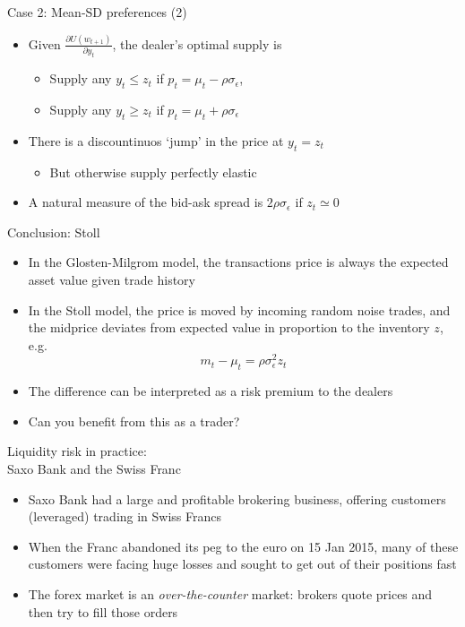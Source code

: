 \documentclass[english,10pt]{beamer}
\begin{document}
\begin{frame}{Case 2: Mean-SD preferences (2)}
	\begin{itemize}
		\item Given $\frac{\partial U(w_{t+1})}{\partial y_t}$, the dealer's optimal supply is
		\begin{itemize}
			\item Supply any $y_t \leq z_t$ if $p_t = \mu_t - \rho\sigma_{\epsilon}$,
			\item Supply any $y_t \geq z_t$ if $p_t = \mu_t + \rho\sigma_{\epsilon}$
		\end{itemize}
		\item There is a discountinuos `jump' in the price at $y_t=z_t$
		\begin{itemize}
			\item But otherwise supply perfectly elastic
		\end{itemize}
		\item A natural measure of the bid-ask spread is $2\rho\sigma_{\epsilon}$ if $z_t \simeq 0$
	\end{itemize}
\end{frame}


\begin{frame}{Conclusion: Stoll}
	\begin{itemize}
		\item In the Glosten-Milgrom model, the transactions price is always the expected asset value given trade history
		\item In the Stoll model, the price is moved by incoming random noise trades, and the midprice deviates from expected value in proportion to the inventory $z$, e.g.
		\[
		m_t - \mu_t = \rho \sigma^2_\epsilon z_t
		\]
		\item The difference can be interpreted as a risk premium to the  dealers
		\item Can you benefit from this as a trader? \pause {}
	\end{itemize}
\end{frame}


\begin{frame}{Liquidity risk in practice: \\Saxo Bank and the Swiss Franc}
	\begin{itemize}
		\item Saxo Bank had a  large and profitable brokering business, offering customers (leveraged) trading in Swiss Francs
		\item When the Franc abandoned its peg to the euro on 15 Jan 2015, many of these customers were facing huge losses and sought to get out of their positions fast
		\item The forex market is an \textit{over-the-counter} market: brokers quote prices and then try to fill those orders
	\end{itemize}
\end{frame}
\end{document}
